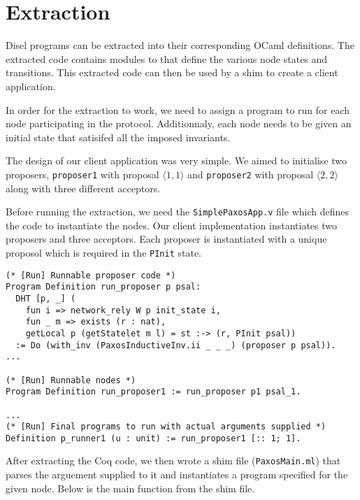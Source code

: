 \section{Extraction}
Disel programs can be extracted into their corresponding OCaml definitions.
The extracted code contains modules to that define the various node states
and transitions. This extracted code can then be used by a shim to create a
client application.

In order for the extraction to work, we need to assign a program to run for
each node participating in the protocol. Additionnaly, each node needs to
be given an initial state that satisifed all the imposed invariants.

The design of our client application was very simple. We aimed to initialise
two proposers, \texttt{proposer1} with proposal $\langle 1, 1\rangle$ and
\texttt{proposer2} with proposal $\langle 2, 2\rangle$ along with three different
acceptors.

Before running the extraction, we need the \texttt{SimplePaxosApp.v} file
which defines the code to instantiate the nodes.
Our client implementation instantiates two proposers and three acceptors.
Each proposer is instantiated with a unique proposol which is required in the
\texttt{PInit} state.

\begin{lstlisting}
(* [Run] Runnable proposer code *)
Program Definition run_proposer p psal:
  DHT [p, _] (
    fun i => network_rely W p init_state i,
    fun _ m => exists (r : nat),
    getLocal p (getStatelet m l) = st :-> (r, PInit psal))
  := Do (with_inv (PaxosInductiveInv.ii _ _ _) (proposer p psal)).
...

(* [Run] Runnable nodes *)
Program Definition run_proposer1 := run_proposer p1 psal_1.

...
(* [Run] Final programs to run with actual arguments supplied *)
Definition p_runner1 (u : unit) := run_proposer1 [:: 1; 1].
\end{lstlisting}

After extracting the Coq code, we then wrote a shim file (\texttt{PaxosMain.ml})
that parses the arguement supplied to it and instantiates a program specified
for the given node. Below is the main function from the shim file.

